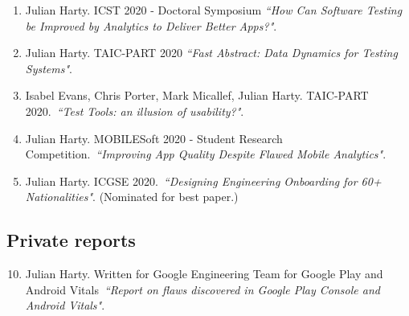 \begin{enumerate}
    \item Julian Harty. ICST 2020 - Doctoral Symposium \emph{``How Can Software Testing be Improved by Analytics to Deliver Better Apps?"}.
    
    \item Julian Harty. TAIC-PART 2020 \emph{``Fast Abstract: Data Dynamics for Testing Systems"}.
    
    \item Isabel Evans, Chris Porter, Mark Micallef, Julian Harty. TAIC-PART 2020.~\emph{``Test Tools: an illusion of usability?"}.
    
    \item Julian Harty. MOBILESoft 2020 - Student Research Competition.~\emph{``Improving App Quality Despite Flawed Mobile Analytics"}.
    
    \item Julian Harty. ICGSE 2020.~\emph{``Designing Engineering Onboarding for 60+ Nationalities"}. (Nominated for best paper.)

\end{enumerate}

\subsection{Private reports}
\begin{enumerate}

    \setcounter{enumi}{9}
    \item Julian Harty. Written for Google Engineering Team for Google Play and Android Vitals~\emph{``Report on flaws discovered in Google Play Console and Android Vitals"}.

\end{enumerate}

